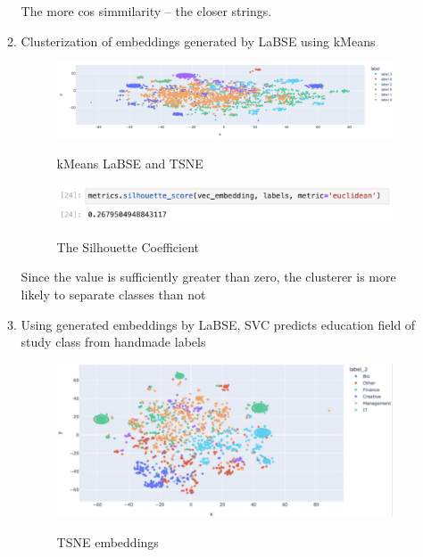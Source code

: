\documentclass[12pt]{article}
\theoremstyle{plain}
\theoremstyle{definition}
\begin{document}
\begin{enumerate}
\begin{enumerate}
        The more cos simmilarity -- the closer strings.
        
        \item Clusterization of embeddings generated by LaBSE using kMeans
        
        \begin{figure}[H]
          \centering
          \includegraphics[width=140mm]{figures/collection/kMeans-LaBSE.png}
          \label{fig:gd}
          \caption{kMeans LaBSE and TSNE}
        \end{figure}
        
        \begin{figure}[H]
          \centering
          \includegraphics[width=100mm]{figures/collection/kMeans-LaBSE-metric.png}
          \label{fig:gd}
          \caption{The Silhouette Coefficient}
        \end{figure}
        
        Since the value is sufficiently greater than zero, the clusterer is more likely to separate classes than not
    
        \item Using generated embeddings by LaBSE, SVC predicts education field of study class from handmade labels
        
        \begin{figure}[H]
          \centering
          \includegraphics[width=140mm]{figures/collection/Embeddings-handmade.png}
          \label{fig:gd}
          \caption{TSNE embeddings}
        \end{figure}
        

\end{enumerate}
\end{enumerate}
\end{document}
